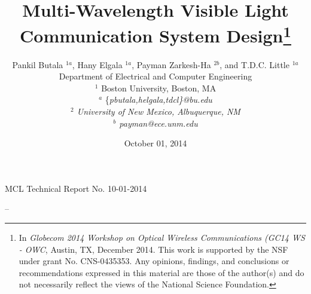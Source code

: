 \documentclass[10pt]{article}
\begin{document}
\title{Multi-Wavelength Visible Light Communication System Design\footnote{In {\it Globecom 2014 Workshop on Optical Wireless Communications (GC14 WS - OWC}, Austin, TX, December 2014. This work is 
supported by the NSF under grant
No. CNS-0435353. Any opinions, findings, and conclusions or
recommendations expressed in this material are those of the author(s)
and do not necessarily reflect the views of the National Science
Foundation.}}

\author{Pankil Butala $^{1a}$, Hany Elgala $^{1a}$, Payman Zarkesh-Ha $^{2b}$, and T.D.C. Little $^{1a}$\\
Department of Electrical and Computer Engineering\\
$^1$ Boston University, Boston, MA\\
$^a$ \{\it{pbutala,helgala,tdcl\}@bu.edu}\\
$^2$ University of New Mexico, Albuquerque, NM\\
$^b$ \it{payman@ece.unm.edu}\\}


\date{October 01, 2014}
\maketitle

\begin{center}
MCL Technical Report No. 10-01-2014
\end{center}


--

\newpage










\end{document}
